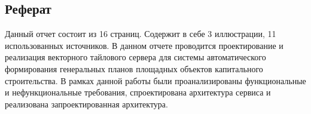 \subsection*{\Large{Реферат}}
Данный отчет состоит из 16 страниц.
Содержит в себе 3 иллюстрации, 11 использованных источников.
В данном отчете проводится проектирование и реализация векторного тайлового сервера
для системы автоматического формирования генеральных планов площадных объектов капитального строительства.
В рамках данной работы были проанализированы функциональные и нефункциональные требования, спроектирована
архитектура сервиса и реализована запроектированная архитектура.